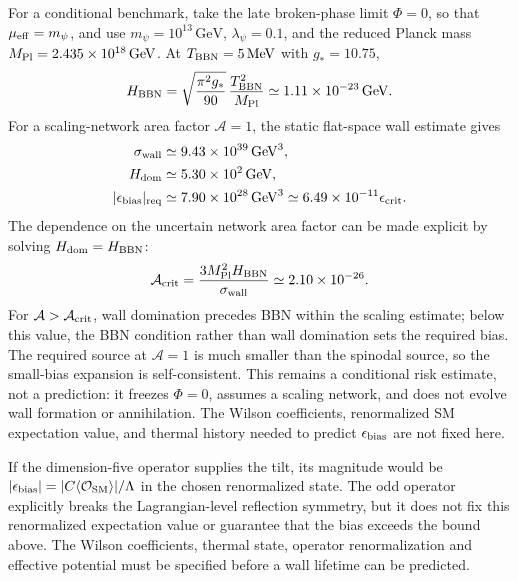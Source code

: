 \documentclass[epj]{svjour}
\begin{document}
For a conditional benchmark, take the late broken-phase limit
$\Phi=0$, so that $\mu_{\rm eff}=m_\psi$, and use
$m_\psi=10^{13}\,\mathrm{GeV}$,
$\lambda_\psi=0.1$, and the reduced Planck mass
$M_{\rm Pl}=2.435\times10^{18}\,\mathrm{GeV}$.
At $T_{\rm BBN}=5\,\mathrm{MeV}$ with $g_*=10.75$,
\begin{equation}
H_{\rm BBN}
=\sqrt{\frac{\pi^2g_*}{90}}\,
\frac{T_{\rm BBN}^2}{M_{\rm Pl}}
\simeq1.11\times10^{-23}\,\mathrm{GeV}.
\end{equation}
For a scaling-network area factor $\mathcal A=1$, the static
flat-space wall estimate gives
\begin{equation}
\begin{aligned}
\sigma_{\rm wall}&\simeq9.43\times10^{39}\,\mathrm{GeV}^3,\\
H_{\rm dom}&\simeq5.30\times10^2\,\mathrm{GeV},\\
|\epsilon_{\rm bias}|_{\rm req}
&\simeq7.90\times10^{28}\,\mathrm{GeV}^3
\simeq6.49\times10^{-11}\epsilon_{\rm crit}.
\end{aligned}
\end{equation}
The dependence on the uncertain network area factor can be made
explicit by solving $H_{\rm dom}=H_{\rm BBN}$:
\begin{equation}
\mathcal A_{\rm crit}
=\frac{3M_{\rm Pl}^2H_{\rm BBN}}{\sigma_{\rm wall}}
\simeq2.10\times10^{-26}.
\label{eq:ptum_domain_wall_area_critical}
\end{equation}
For $\mathcal A>\mathcal A_{\rm crit}$, wall domination precedes
BBN within the scaling estimate; below this value, the BBN condition
rather than wall domination sets the required bias. The required source
at $\mathcal A=1$ is much smaller than the spinodal source, so the
small-bias expansion is self-consistent. This remains a conditional
risk estimate, not a prediction: it freezes $\Phi=0$, assumes a
scaling network, and does not evolve wall formation or annihilation.
The Wilson coefficients, renormalized SM expectation value, and thermal
history needed to predict $\epsilon_{\rm bias}$ are not fixed here.

If the dimension-five operator supplies the tilt, its magnitude
would be $|\epsilon_{\rm bias}|=
|C\langle\mathcal O_{\rm SM}\rangle|/\Lambda$ in the chosen
renormalized state. The odd operator explicitly breaks the
Lagrangian-level reflection symmetry, but it does not fix this
renormalized expectation value or guarantee that the bias exceeds
the bound above. The Wilson coefficients, thermal state, operator
renormalization and effective potential must be specified before
a wall lifetime can be predicted.
\end{document}
